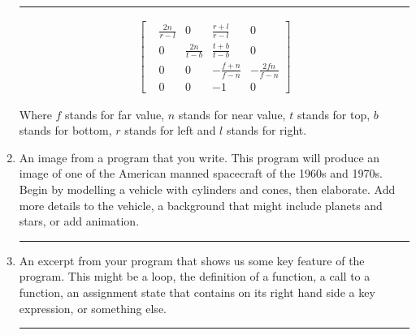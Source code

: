 \documentclass[oneside]{article}
\newenvironment{answer}
  {\vspace*{0.2cm} \rule{12cm}{0.02cm} \vspace*{0.2cm}}
  {\vspace*{0.2cm}}
\begin{document}
\begin{enumerate}
	      \begin{answer}
	      	\begin{align*}
	      		\begin{bmatrix}
	      		  & \frac{2n}{r-l} & 0              & \frac{r+l}{r-l}  & 0                \\
	      		  & 0              & \frac{2n}{t-b} & \frac{t+b}{t-b}  & 0                \\
	      		  & 0              & 0              & -\frac{f+n}{f-n} & -\frac{2fn}{f-n} \\
	      		  & 0              & 0              & -1               & 0
	      		\end{bmatrix}
	      	\end{align*}

	      	Where $f$ stands for far value, $n$ stands for near value, $t$ stands for top, $b$ stands for bottom, $r$ stands for left and $l$ stands for right.
	      \end{answer}

	\item An image from a program that you write. This program will produce an image of one of the American manned spacecraft of the 1960s and 1970s. Begin by modelling a vehicle with cylinders and cones, then elaborate. Add more details to the vehicle, a background that might include planets and stars, or add animation.

	      \begin{answer}

	      \end{answer}

	\item An excerpt from your program that shows us some key feature of the program. This might be a loop, the definition of a function, a call to a function, an assignment state that contains on its right hand side a key expression, or something else.

	      \begin{answer}

	      \end{answer}

\end{enumerate}
\end{document}
